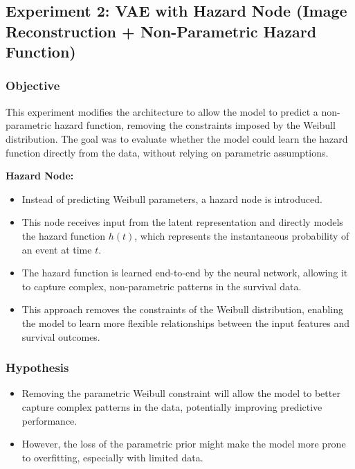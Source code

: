 \documentclass{article}
\begin{document}
\subsection{Experiment 2: VAE with Hazard Node (Image Reconstruction + Non-Parametric Hazard Function)}

\subsubsection{Objective}
This experiment modifies the architecture to allow the model to predict a non-parametric hazard function, removing the constraints imposed by the Weibull distribution. The goal was to evaluate whether the model could learn the hazard function directly from the data, without relying on parametric assumptions.


\textbf{Hazard Node:}
\begin{itemize}
    \item Instead of predicting Weibull parameters, a hazard node is introduced.
    \item This node receives input from the latent representation and directly models the hazard function $h(t)$, which represents the instantaneous probability of an event at time $t$.
    \item The hazard function is learned end-to-end by the neural network, allowing it to capture complex, non-parametric patterns in the survival data.
    \item This approach removes the constraints of the Weibull distribution, enabling the model to learn more flexible relationships between the input features and survival outcomes.
\end{itemize}

\subsubsection{Hypothesis}
\begin{itemize}
    \item Removing the parametric Weibull constraint will allow the model to better capture complex patterns in the data, potentially improving predictive performance.
    \item However, the loss of the parametric prior might make the model more prone to overfitting, especially with limited data.
\end{itemize}
\end{document}
